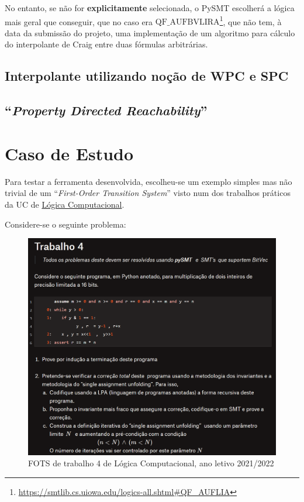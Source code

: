 \documentclass[11pt,a4paper]{report}%
\def\pdr{``\textit{Property Directed Reachability}''\xspace}
\def\fots{``\textit{First-Order Transition System}''\xspace}
\def\lc{Lógica Computacional}
\begin{document}
No entanto, se não for \textbf{explicitamente} selecionada, o PySMT escolherá
a lógica mais geral que conseguir, que no caso era $\text{QF_AUFBVLIRA}$\footnote{\url{https://smtlib.cs.uiowa.edu/logics-all.shtml#QF_AUFLIA}}, que
não tem, à data da submissão do projeto, uma implementação de um algoritmo para
cálculo do interpolante de Craig entre duas fórmulas arbitrárias.

\section{Interpolante utilizando noção de WPC e SPC}

\newpage
\section{\pdr}

\chapter{Caso de Estudo}\label{chap:case_study}

Para testar a ferramenta desenvolvida, escolheu-se um exemplo simples mas não trivial
de um \fots visto num dos trabalhos práticos da UC de \href{https://paper.dropbox.com/doc/LC-2021-2022-Trabalhos-Praticos-NZEwyS6N5YQQTw1XsYimE#:uid=036036509450795602269559&h2=Trabalho-4}{\lc}.

Considere-se o seguinte problema:

\begin{figure}[H]
      \centering
      \includegraphics[scale=0.75]{lc-trab4.png}
      \caption{FOTS de trabalho 4 de \lc, ano letivo 2021/2022}
      \label{fig:trab4}
\end{figure}
\end{document}
